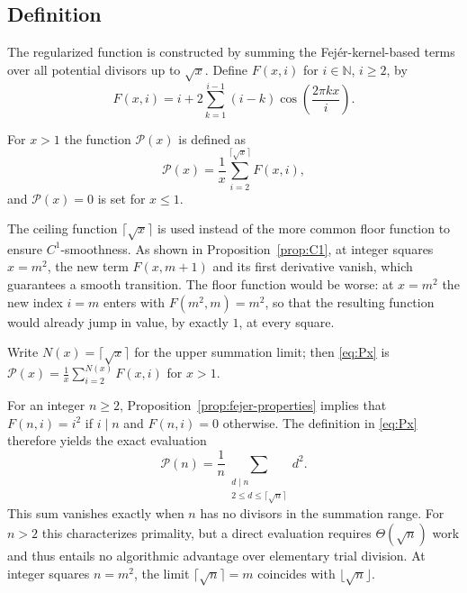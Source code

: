 \subsection{Definition}
The regularized function is constructed by summing the Fejér-kernel-based terms over all potential divisors up to $\sqrt{x}$.
Define $F(x,i)$ for $i\in\mathbb{N}$, $i\ge 2$, by
\begin{equation}\label{eq:Fxi}
F(x,i) = i+2\sum_{k=1}^{i-1}(i-k)\cos\left(\frac{2\pi k x}{i}\right).
\end{equation}


\begin{definition}\label{def:Px}
For $x>1$ the function $\mathcal{P}(x)$ is defined as
\begin{equation}\label{eq:Px}
\mathcal{P}(x)=\frac{1}{x}\sum_{i=2}^{\lceil\sqrt{x}\rceil} F(x,i),
\end{equation}
and $\mathcal{P}(x)=0$ is set for $x\le1$.
\end{definition}

\begin{remark}
The ceiling function $\lceil\sqrt{x}\rceil$ is used instead of the more common floor function to ensure $C^1$-smoothness. As shown in Proposition~\ref{prop:C1}, at integer squares $x=m^2$, the new term $F(x, m+1)$ and its first derivative vanish, which guarantees a smooth transition. The floor function would be worse: at $x=m^2$ the new index $i=m$ enters with $F(m^2,m)=m^2$, so that the resulting function would already jump in value, by exactly $1$, at every square.
\end{remark}

Write $N(x)=\lceil\sqrt{x}\rceil$ for the upper summation limit; then \eqref{eq:Px} is $\mathcal{P}(x)=\frac{1}{x}\sum_{i=2}^{N(x)} F(x,i)$ for $x>1$.

\begin{remark}\label{rem:integer-eval}
For an integer $n\ge 2$, Proposition~\ref{prop:fejer-properties} implies that $F(n,i)=i^2$ if $i\mid n$ and $F(n,i)=0$ otherwise. The definition in \eqref{eq:Px} therefore yields the exact evaluation
\[
\mathcal P(n)=\frac{1}{n}\sum_{\substack{d\mid n \\ 2\le d\le \lceil\sqrt{n}\rceil}} d^2.
\]
This sum vanishes exactly when $n$ has no divisors in the summation range. For $n>2$ this characterizes primality, but a direct evaluation requires $\Theta(\sqrt n)$ work and thus entails no algorithmic advantage over elementary trial division. At integer squares $n=m^2$, the limit $\lceil\sqrt{n}\rceil=m$ coincides with $\lfloor\sqrt{n}\rfloor$.
\end{remark}

